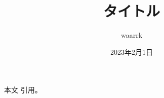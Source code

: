 \documentclass{jsarticle}
\title{タイトル}
\author{waarrk}
\date{2023年2月1日}
\begin{document}
\maketitle

本文
引用\cite{hoge}。

\nocite{*}


\end{document}
